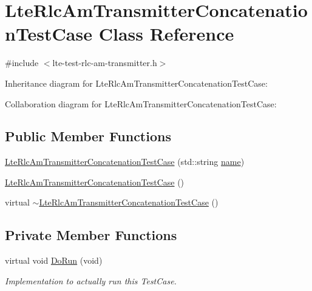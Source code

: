 \hypertarget{classLteRlcAmTransmitterConcatenationTestCase}{}\section{Lte\+Rlc\+Am\+Transmitter\+Concatenation\+Test\+Case Class Reference}
\label{classLteRlcAmTransmitterConcatenationTestCase}


{\ttfamily \#include $<$lte-\/test-\/rlc-\/am-\/transmitter.\+h$>$}



Inheritance diagram for Lte\+Rlc\+Am\+Transmitter\+Concatenation\+Test\+Case\+:


Collaboration diagram for Lte\+Rlc\+Am\+Transmitter\+Concatenation\+Test\+Case\+:
\subsection*{Public Member Functions}
\begin{DoxyCompactItemize}
\item 
\hyperlink{classLteRlcAmTransmitterConcatenationTestCase_a4827539db246f1b7decaa37f7a96899a}{Lte\+Rlc\+Am\+Transmitter\+Concatenation\+Test\+Case} (std\+::string \hyperlink{generate__test__data__lte__spectrum__model_8m_ab74e6bf80237ddc4109968cedc58c151}{name})
\item 
\hyperlink{classLteRlcAmTransmitterConcatenationTestCase_a74f8e5049042226cf6a90d716e3ef789}{Lte\+Rlc\+Am\+Transmitter\+Concatenation\+Test\+Case} ()
\item 
virtual \hyperlink{classLteRlcAmTransmitterConcatenationTestCase_a10731834e90925dd68e7afafa6fc63df}{$\sim$\+Lte\+Rlc\+Am\+Transmitter\+Concatenation\+Test\+Case} ()
\end{DoxyCompactItemize}
\subsection*{Private Member Functions}
\begin{DoxyCompactItemize}
\item 
virtual void \hyperlink{classLteRlcAmTransmitterConcatenationTestCase_abb245b1b72965664fb72b8829853703e}{Do\+Run} (void)
\begin{DoxyCompactList}\small\item\em Implementation to actually run this Test\+Case. \end{DoxyCompactList}\end{DoxyCompactItemize}
